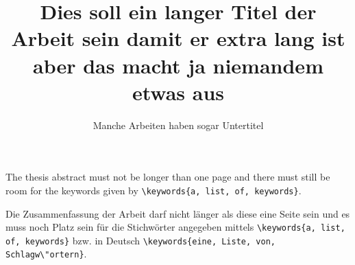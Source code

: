\documentclass[online,a4paper,description-bsc]{isw}
\begin{document}
    \frontmatter
    
    \maketitle
    
    \begin{otherlanguage}{ngerman}
        \title{Dies soll ein langer Titel der Arbeit sein damit er extra lang ist aber das macht ja niemandem etwas aus}
        \subtitle{Manche Arbeiten haben sogar Untertitel}
        
        \maketitle
    \end{otherlanguage}
    
    
    \DeclarationOfAuthorship
    
    \begin{thesisabstract}
        The thesis abstract must not be longer than one page and there must still be room for the keywords given by \lstinline!\keywords{a, list, of, keywords}!.
        
        \lipsum[1-3]
    \end{thesisabstract}
    
    \begin{otherlanguage}{ngerman}
        \begin{thesisabstract}
            Die Zusammenfassung der Arbeit darf nicht l\"anger als diese eine Seite sein und es muss noch Platz sein f\"ur die Stichw\"orter angegeben mittels \lstinline!\keywords{a, list, of, keywords}! bzw. in Deutsch \lstinline!\keywords{eine, Liste, von, Schlagw\"ortern}!.
            
            \lipsum[4-6]
        \end{thesisabstract}
    \end{otherlanguage}
    
\end{document}
